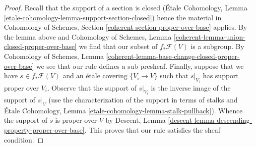 \documentclass{stacks-project}
\theoremstyle{plain}
\theoremstyle{definition}
\theoremstyle{remark}
\numberwithin{equation}{subsection}
\begin{document}
\begin{proof}
Recall that the support of a section is closed
(\'Etale Cohomology, Lemma \ref{etale-cohomology-lemma-support-section-closed})
hence the material in
Cohomology of Schemes, Section \ref{coherent-section-proper-over-base}
applies. By the lemma above and
Cohomology of Schemes, Lemma \ref{coherent-lemma-union-closed-proper-over-base}
we find that our subset of $f_*\mathcal{F}(V)$ is a subgroup.
By Cohomology of Schemes, Lemma
\ref{coherent-lemma-base-change-closed-proper-over-base}
we see that our rule defines a sub presheaf.
Finally, suppose that we have $s \in f_*\mathcal{F}(V)$
and an \'etale covering $\{V_i \to V\}$ such that
$s|_{V_i}$ has support proper over $V_i$.
Observe that the support of $s|_{V_i}$ is the inverse
image of the support of $s|_V$ (use the characterization
of the support in terms of stalks and
\'Etale Cohomology, Lemma \ref{etale-cohomology-lemma-stalk-pullback}).
Whence the support of $s$ is proper over $V$ by
Descent, Lemma \ref{descent-lemma-descending-property-proper-over-base}.
This proves that our rule satisfies the sheaf condition.
\end{proof}
\end{document}
